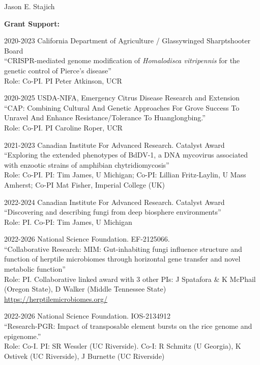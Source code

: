 \documentclass[10pt]{article}
\begin{document}
\begin{cv}{\centerline{Jason E. Stajich}}
\begin{cvlistcompact}{\bf Grant Support:}
\item [2020-2023] California Department of Agriculture / Glassywinged Sharptshooter Board  \\
``CRISPR-mediated genome modification of \textit{Homalodisca vitripennis} for the genetic control of Pierce's disease'' \\
Role: Co-PI. PI Peter Atkinson, UCR

\item [2020-2025] USDA-NIFA, Emergency Citrus Disease Research and Extension \\
``CAP: Combining Cultural And Genetic Approaches For Grove Success To Unravel And Enhance Resistance/Tolerance To Huanglongbing.'' \\
Role: Co-PI. PI Caroline Roper, UCR

\item [2021-2023] Canadian Institute For Advanced Research. Catalyst Award \\
  ``Exploring the extended phenotypes of BdDV-1, a DNA mycovirus associated with enzootic strains of amphibian chytridiomycosis'' \\
Role: Co-PI. PI: Tim James, U Michigan; Co-PI: Lillian Fritz-Laylin, U Mass Amherst; Co-PI Mat Fisher, Imperial College (UK)

\item [2022-2024] Canadian Institute For Advanced Research. Catalyst Award \\
  ``Discovering and describing fungi from deep biosphere environments'' \\
Role: PI. Co-PI: Tim James, U Michigan

\item [2022-2026] National Science Foundation. EF-2125066. \\
``Collaborative Research: MIM: Gut-inhabiting fungi influence structure and function of herptile microbiomes through horizontal gene transfer and novel metabolic function'' \\
  Role: PI. Collaborative linked award with 3 other PIs: J Spatafora \& K McPhail (Oregon State), D Walker (Middle Tennessee State)
\url{https://herptilemicrobiomes.org/}

\item [2022-2026] National Science Foundation. IOS-2134912 \\
  ``Research-PGR: Impact of transposable element bursts on the rice genome and epigenome.'' \\
Role: Co-I. PI: SR Wessler (UC Riverside). Co-I: R Schmitz (U Georgia), K Ostivek (UC Riverside), J Burnette (UC Riverside)


\end{cvlistcompact}
\end{cv}
\end{document}
